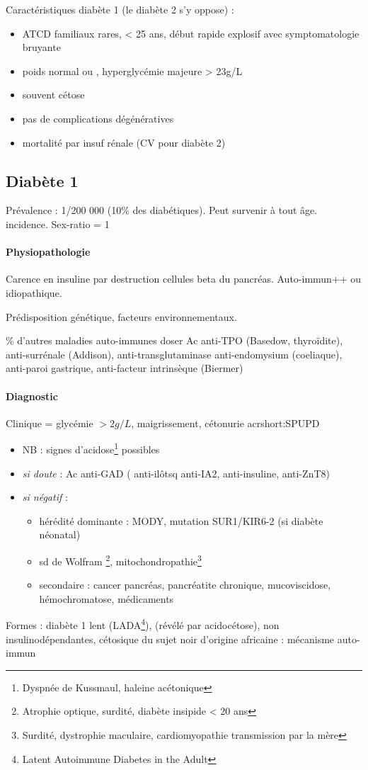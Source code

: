 \documentclass{book}
\begin{document}
Caractéristiques diabète 1 (le diabète 2 s'y oppose) : 
\begin{itemize}
\item ATCD familiaux rares, < 25 ans, début rapide explosif avec symptomatologie bruyante
\item poids normal ou \dec, hyperglycémie majeure > 23g/L
\item souvent cétose
\item pas de complications dégénératives
\item mortalité par insuf rénale (CV pour diabète 2)
\end{itemize}

\subsection{Diabète 1}
\label{sec:org122278f}
Prévalence : 1/200 000 (10\% des diabétiques). Peut survenir à tout âge. \inc
incidence. Sex-ratio = 1

\paragraph{Physiopathologie}
\label{sec:org6f53281}
Carence en insuline par destruction cellules beta du pancréas. Auto-immun++ ou idiopathique.

Prédisposition génétique, facteurs environnementaux.

\% d'autres maladies auto-immunes \thus doser Ac anti-TPO (Basedow,
thyroïdite), anti-surrénale (Addison), anti-transglutaminase \textpm{} anti-endomysium
(coeliaque), anti-paroi gastrique, anti-facteur intrinsèque (Biermer)

\paragraph{Diagnostic}
\label{sec:orgc374559}
Clinique =  glycémie \(> 2g/L\), maigrissement, cétonurie \textpm{} acrshort:SPUPD
\begin{itemize}
\item NB : signes d'acidose\footnote{Dyspnée de Kussmaul, haleine acétonique} possibles
\item \emph{si doute} : Ac anti-GAD (\textpm{} anti-ilôtsq anti-IA2, anti-insuline, anti-ZnT8)
\item \emph{si négatif} :
\begin{itemize}
\item hérédité dominante : MODY, mutation SUR1/KIR6-2 (si diabète néonatal)
\item sd de Wolfram \footnote{Atrophie optique, surdité, diabète insipide < 20 ans}, mitochondropathie\footnote{Surdité, dystrophie maculaire, cardiomyopathie transmission par la mère}
\item secondaire : cancer pancréas, pancréatite chronique, mucoviscidose, hémochromatose, médicaments
\end{itemize}
\end{itemize}
Formes : diabète 1 lent (LADA\footnote{Latent Autoimmune Diabetes in the Adult}), (révélé par acidocétose), non insulinodépendantes, cétosique du sujet noir d'origine africaine : mécanisme
   auto-immun
\end{document}
